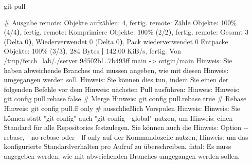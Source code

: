 \documentclass[
  ngerman,
  letterpaper,
  DIV=11]{scrreprt}
\newenvironment{Shaded}{\begin{snugshade}}{\end{snugshade}}
\newcommand{\AttributeTok}[1]{\textcolor[rgb]{0.40,0.45,0.13}{#1}}
\newcommand{\CommentTok}[1]{\textcolor[rgb]{0.37,0.37,0.37}{#1}}
\newcommand{\ErrorTok}[1]{\textcolor[rgb]{0.68,0.00,0.00}{#1}}
\newcommand{\ExtensionTok}[1]{\textcolor[rgb]{0.00,0.23,0.31}{#1}}
\newcommand{\FunctionTok}[1]{\textcolor[rgb]{0.28,0.35,0.67}{#1}}
\newcommand{\KeywordTok}[1]{\textcolor[rgb]{0.00,0.23,0.31}{\textbf{#1}}}
\newcommand{\NormalTok}[1]{\textcolor[rgb]{0.00,0.23,0.31}{#1}}
\newcommand{\OperatorTok}[1]{\textcolor[rgb]{0.37,0.37,0.37}{#1}}
\newcommand{\StringTok}[1]{\textcolor[rgb]{0.13,0.47,0.30}{#1}}
\begin{document}
\begin{Shaded}
\begin{Highlighting}[]
\FunctionTok{git}\NormalTok{ pull }

\CommentTok{\# Ausgabe}
\ExtensionTok{remote:}\NormalTok{ Objekte aufzählen: 4, fertig.}
\ExtensionTok{remote:}\NormalTok{ Zähle Objekte: 100\% }\ErrorTok{(}\ExtensionTok{4/4}\KeywordTok{)}\ExtensionTok{,}\NormalTok{ fertig.}
\ExtensionTok{remote:}\NormalTok{ Komprimiere Objekte: 100\% }\ErrorTok{(}\ExtensionTok{2/2}\KeywordTok{)}\ExtensionTok{,}\NormalTok{ fertig.}
\ExtensionTok{remote:}\NormalTok{ Gesamt 3 }\ErrorTok{(}\ExtensionTok{Delta}\NormalTok{ 0}\KeywordTok{)}\ExtensionTok{,}\NormalTok{ Wiederverwendet 0 }\ErrorTok{(}\ExtensionTok{Delta}\NormalTok{ 0}\KeywordTok{)}\ExtensionTok{,}\NormalTok{ Pack wiederverwendet 0}
\ExtensionTok{Entpacke}\NormalTok{ Objekte: 100\% }\ErrorTok{(}\ExtensionTok{3/3}\KeywordTok{)}\ExtensionTok{,}\NormalTok{ 284 Bytes }\KeywordTok{|} \ExtensionTok{142.00}\NormalTok{ KiB/s, fertig.}
\ExtensionTok{Von}\NormalTok{ /tmp/fetch\_lab/./server}
   \ExtensionTok{9d502b1..7b493ff}\NormalTok{  main       }\AttributeTok{{-}}\OperatorTok{\textgreater{}}\NormalTok{ origin/main}
\ExtensionTok{Hinweis:}\NormalTok{ Sie haben abweichende Branches und müssen angeben, wie mit diesen}
\ExtensionTok{Hinweis:}\NormalTok{ umgegangen werden soll.}
\ExtensionTok{Hinweis:}\NormalTok{ Sie können dies tun, indem Sie einen der folgenden Befehle vor dem}
\ExtensionTok{Hinweis:}\NormalTok{ nächsten Pull ausführen:}
\ExtensionTok{Hinweis:} 
\ExtensionTok{Hinweis:}\NormalTok{   git config pull.rebase false  }\CommentTok{\# Merge}
\ExtensionTok{Hinweis:}\NormalTok{   git config pull.rebase true   }\CommentTok{\# Rebase}
\ExtensionTok{Hinweis:}\NormalTok{   git config pull.ff only       }\CommentTok{\# ausschließlich Vorspulen}
\ExtensionTok{Hinweis:} 
\ExtensionTok{Hinweis:}\NormalTok{ Sie können statt }\StringTok{"git config"}\NormalTok{ auch }\StringTok{"git config {-}{-}global"}\NormalTok{ nutzen, um}
\ExtensionTok{Hinweis:}\NormalTok{ einen Standard für alle Repositories festzulegen. Sie können auch die}
\ExtensionTok{Hinweis:}\NormalTok{ Option }\AttributeTok{{-}{-}rebase,} \AttributeTok{{-}{-}no{-}rebase}\NormalTok{ oder }\AttributeTok{{-}{-}ff{-}only}\NormalTok{ auf der Kommandozeile nutzen,}
\ExtensionTok{Hinweis:}\NormalTok{ um das konfigurierte Standardverhalten pro Aufruf zu überschreiben.}
\ExtensionTok{fatal:}\NormalTok{ Es muss angegeben werden, wie mit abweichenden Branches umgegangen werden sollen.}
\end{Highlighting}
\end{Shaded}
\end{document}
